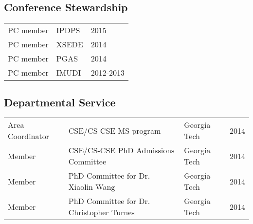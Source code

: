 \documentclass[letterpaper]{article}
\renewenvironment{itemize}{
  \begin{list}{}{
    \setlength{\leftmargin}{1.5em}
  }
}{
  \end{list}
}
\begin{document}
\subsection*{Conference Stewardship}
\begin{tabular}{lll}
PC member & IPDPS & 2015 \\
PC member & XSEDE & 2014 \\
PC member & PGAS & 2014 \\
PC member & IMUDI & 2012-2013 \\
\end{tabular}

\subsection*{Departmental Service}
\begin{tabular}{llll}
Area Coordinator & CSE/CS-CSE MS program & Georgia Tech & 2014 \\
Member           & CSE/CS-CSE PhD Admissions Committee  & Georgia Tech & 2014 \\
Member           & PhD Committee for Dr. Xiaolin Wang   & Georgia Tech & 2014 \\
Member           & PhD Committee for Dr. Christopher Turnes & Georgia Tech & 2014 
\end{tabular}

\end{document}

